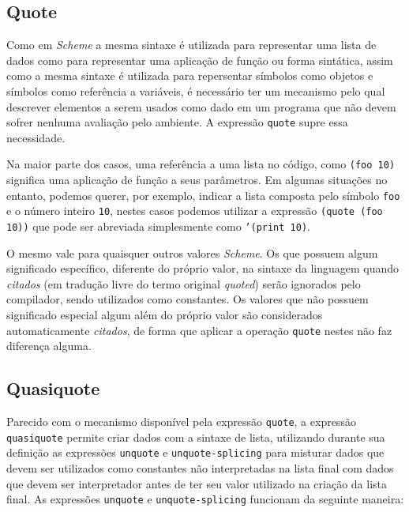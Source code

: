 \subsection{Quote}
\label{ss:quote}

Como em \textit{Scheme} a mesma sintaxe é utilizada para representar uma lista
de dados como para representar uma aplicação de função ou forma sintática,
assim como a mesma sintaxe é utilizada para repersentar símbolos como objetos e
símbolos como referência a variáveis, é necessário ter um mecanismo pelo qual
descrever elementos a serem usados como dado em um programa que não devem
sofrer nenhuma avaliação pelo ambiente. A expressão \texttt{quote} supre essa
necessidade.

Na maior parte dos casos, uma referência a uma lista no código, como
\texttt{(foo 10)} significa uma aplicação de função a seus parâmetros. Em 
algumas situações no entanto, podemos querer, por exemplo, indicar a lista
composta pelo símbolo \texttt{foo} e o número inteiro \texttt{10}, nestes
casos podemos utilizar a expressão \texttt{(quote (foo 10))} que pode ser 
abreviada simplesmente como \texttt{'(print 10)}. 

O mesmo vale para quaisquer outros valores \textit{Scheme}. Os que possuem
algum significado específico, diferente do próprio valor, na sintaxe da
linguagem quando \textit{citados} (em tradução livre do termo original
\textit{quoted}) serão ignorados pelo compilador, sendo utilizados como
constantes. Os valores que não possuem significado especial algum além do
próprio valor são considerados automaticamente \textit{citados}, de forma que
aplicar a operação \texttt{quote} nestes não faz diferença alguma.

\subsection{Quasiquote}
\label{ss:quasiquote}

Parecido com o mecanismo disponível pela expressão \texttt{quote}, a expressão
\texttt{quasiquote} permite criar dados com a sintaxe de lista, utilizando
durante sua definição as expressões \texttt{unquote} e \texttt{unquote-splicing}
para misturar dados que devem ser utilizados como constantes não interpretadas
na lista final com dados que devem ser interpretador antes de ter seu valor 
utilizado na criação da lista final. As expressões \texttt{unquote} e 
\texttt{unquote-splicing} funcionam da seguinte maneira:

